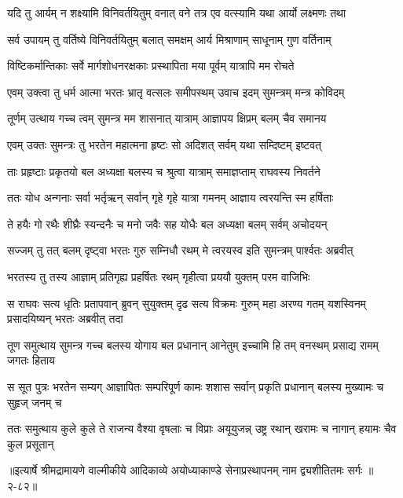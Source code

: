 \twolineshloka
{यदि तु आर्यम् न शक्ष्यामि विनिवर्तयितुम् वनात्}
{वने तत्र एव वत्स्यामि यथा आर्यो लक्ष्मणः तथा} %

\twolineshloka
{सर्व उपायम् तु वर्तिष्ये विनिवर्तयितुम् बलात्}
{समक्षम् आर्य मिश्राणाम् साधूनाम् गुण वर्तिनाम्} %

\twolineshloka
{विष्टिकर्मान्तिकाः सर्वे मार्गशोधनरक्षकाः}
{प्रस्थापिता मया पूर्वम् यात्रापि मम रोचते} %

\twolineshloka
{एवम् उक्त्वा तु धर्म आत्मा भरतः भ्रातृ वत्सलः}
{समीपस्थम् उवाच इदम् सुमन्त्रम् मन्त्र कोविदम्} %

\twolineshloka
{तूर्णम् उत्थाय गच्च त्वम् सुमन्त्र मम शासनात्}
{यात्राम् आज्ञापय क्षिप्रम् बलम् चैव समानय} %

\twolineshloka
{एवम् उक्तः सुमन्त्रः तु भरतेन महात्मना}
{हृष्टः सो अदिशत् सर्वम् यथा सम्दिष्टम् इष्टवत्} %

\twolineshloka
{ताः प्रहृष्टाः प्रकृतयो बल अध्यक्षा बलस्य च}
{श्रुत्वा यात्राम् समाज्ञप्ताम् राघवस्य निवर्तने} %

\twolineshloka
{ततः योध अन्गनाः सर्वा भर्तृऋन् सर्वान् गृहे गृहे}
{यात्रा गमनम् आज्ञाय त्वरयन्ति स्म हर्षिताः} %

\twolineshloka
{ते हयैः गो रथैः शीघ्रैः स्यन्दनैः च मनो जवैः}
{सह योधैः बल अध्यक्षा बलम् सर्वम् अचोदयन्} %

\twolineshloka
{सज्जम् तु तत् बलम् दृष्ट्वा भरतः गुरु सम्निधौ}
{रथम् मे त्वरयस्व इति सुमन्त्रम् पार्श्वतः अब्रवीत्} %

\twolineshloka
{भरतस्य तु तस्य आज्ञाम् प्रतिगृह्य प्रहर्षितः}
{रथम् गृहीत्वा प्रययौ युक्तम् परम वाजिभिः} %

\fourlineindentedshloka
{स राघवः सत्य धृतिः प्रतापवान्}
{ब्रुवन् सुयुक्तम् दृढ सत्य विक्रमः}
{गुरुम् महा अरण्य गतम् यशस्विनम्}
{प्रसादयिष्यन् भरतः अब्रवीत् तदा} %

\fourlineindentedshloka
{तूण समुत्थाय सुमन्त्र गच्च}
{बलस्य योगाय बल प्रधानान्}
{आनेतुम् इच्चामि हि तम् वनस्थम्}
{प्रसाद्य रामम् जगतः हिताय} %

\fourlineindentedshloka
{स सूत पुत्रः भरतेन सम्यग्}
{आज्ञापितः सम्परिपूर्ण कामः}
{शशास सर्वान् प्रकृति प्रधानान्}
{बलस्य मुख्यामः च सुहृज् जनम् च} %

\fourlineindentedshloka
{ततः समुत्थाय कुले कुले ते}
{राजन्य वैश्या वृषलाः च विप्राः}
{अयूयुजन्न् उष्ट्र रथान् खरामः च}
{नागान् हयामः चैव कुल प्रसूतान्} %


॥इत्यार्षे श्रीमद्रामायणे वाल्मीकीये आदिकाव्ये अयोध्याकाण्डे सेनाप्रस्थापनम् नाम द्व्यशीतितमः सर्गः ॥२-८२॥
